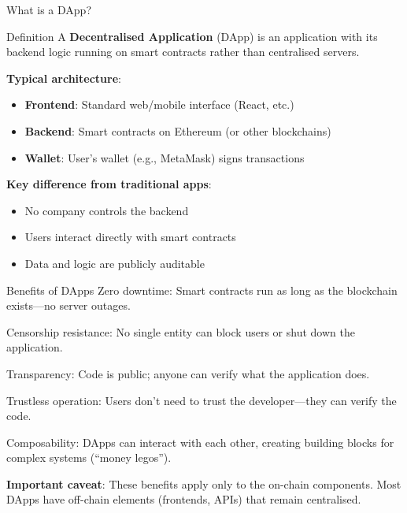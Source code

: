 \documentclass[10pt]{beamer}
\newcommand{\good}[1]{\textcolor{AccentGreen}{#1}}
\begin{document}
\begin{frame}{What is a DApp?}
  \begin{block}{Definition}
    A \textbf{Decentralised Application} (DApp) is an application with its backend logic running on smart contracts rather than centralised servers.
  \end{block}
  
  \vspace{1em}
  \textbf{Typical architecture}:
  \begin{itemize}
    \item \textbf{Frontend}: Standard web/mobile interface (React, etc.)
    \item \textbf{Backend}: Smart contracts on Ethereum (or other blockchains)
    \item \textbf{Wallet}: User's wallet (e.g., MetaMask) signs transactions
  \end{itemize}
  
  \vspace{1em}
  \textbf{Key difference from traditional apps}:
  \begin{itemize}
    \item No company controls the backend
    \item Users interact directly with smart contracts
    \item Data and logic are publicly auditable
  \end{itemize}
\end{frame}

\begin{frame}{Benefits of DApps}
  \good{Zero downtime}: Smart contracts run as long as the blockchain exists---no server outages.
  
  \vspace{0.5em}
  \good{Censorship resistance}: No single entity can block users or shut down the application.
  
  \vspace{0.5em}
  \good{Transparency}: Code is public; anyone can verify what the application does.
  
  \vspace{0.5em}
  \good{Trustless operation}: Users don't need to trust the developer---they can verify the code.
  
  \vspace{0.5em}
  \good{Composability}: DApps can interact with each other, creating building blocks for complex systems (``money legos'').
  
  \vspace{1em}
  \textbf{Important caveat}: These benefits apply only to the on-chain components. Most DApps have off-chain elements (frontends, APIs) that remain centralised.
\end{frame}
\end{document}
